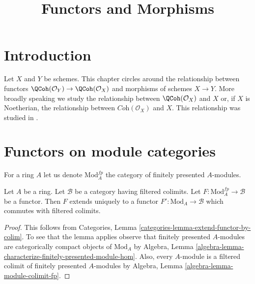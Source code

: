 

%


\title{Functors and Morphisms}


\maketitle

\label{section-phantom}

\tableofcontents

\section{Introduction}
\label{section-introduction}

\noindent
Let $X$ and $Y$ be schemes. This chapter circles around the relationship
between functors $\QCoh(\mathcal{O}_Y) \to \QCoh(\mathcal{O}_X)$ and
morphisms of schemes $X \to Y$. More broadly speaking we study the
relationship between $\QCoh(\mathcal{O}_X)$ and $X$ or, if $X$ is Noetherian,
the relationship between $\textit{Coh}(\mathcal{O}_X)$ and $X$.
This relationship was studied in \cite{Gabriel}.






\section{Functors on module categories}
\label{section-preliminary}

\noindent
For a ring $A$ let us denote $\text{Mod}^{fp}_A$ the category of
finitely presented $A$-modules.

\begin{lemma}
\label{lemma-functor-on-fp-modules}
Let $A$ be a ring. Let $\mathcal{B}$ be a category having filtered
colimits. Let $F : \text{Mod}^{fp}_A \to \mathcal{B}$ be a functor. Then $F$
extends uniquely to a functor $F' : \text{Mod}_A \to \mathcal{B}$
which commutes with filtered colimits.
\end{lemma}

\begin{proof}
This follows from
Categories, Lemma \ref{categories-lemma-extend-functor-by-colim}.
To see that the lemma applies observe that
finitely presented $A$-modules are
categorically compact objects of $\text{Mod}_A$ by
Algebra, Lemma \ref{algebra-lemma-characterize-finitely-presented-module-hom}.
Also, every $A$-module is a filtered colimit
of finitely presented $A$-modules by
Algebra, Lemma \ref{algebra-lemma-module-colimit-fp}.
\end{proof}

